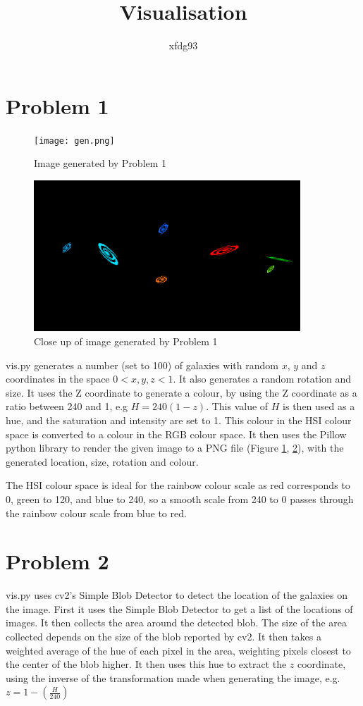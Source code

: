 \documentclass{article}
\title{Visualisation}
\author{xfdg93}
\begin{document}
\maketitle

\section*{Problem 1}
\begin{figure}
	\centering
	\texttt{[image: gen.png]}
	\caption{Image generated by Problem 1}
	\label{fig:gen}
\end{figure}
\begin{figure}
	\centering
	\includegraphics[width=10cm]{croppedgen.png}
	\caption{Close up of image generated by Problem 1}
	\label{fig:closefig}
\end{figure}

vis.py generates a number (set to 100) of galaxies with random $x$, $y$ and $z$ coordinates in the space $0<x,y,z<1$.
It also generates a random rotation and size.
It uses the Z coordinate to generate a colour, by using the Z coordinate as a ratio between 240 and 1, e.g $H = 240(1-z)$.
This value of $H$ is then used as a hue, and the saturation and intensity are set to 1.
This colour in the HSI colour space is converted to a colour in the RGB colour space.
It then uses the Pillow python library to render the given image to a PNG file (Figure \ref{fig:gen}, \ref{fig:closefig}), with the generated location, size, rotation and colour.

The HSI colour space is ideal for the rainbow colour scale as red corresponds to 0, green to 120, and blue to 240, so a smooth scale from 240 to 0 passes through the rainbow colour scale from blue to red.

\section*{Problem 2}

vis.py uses cv2's Simple Blob Detector to detect the location of the galaxies on the image.
First it uses the Simple Blob Detector to get a list of the locations of images.
It then collects the area around the detected blob. The size of the area collected depends on the size of the blob reported by cv2.
It then takes a weighted average of the hue of each pixel in the area, weighting pixels closest to the center of the blob higher.
It then uses this hue to extract the $z$ coordinate, using the inverse of the transformation made when generating the image, e.g. $z = 1-(\frac{H}{240})$
\end{document}
